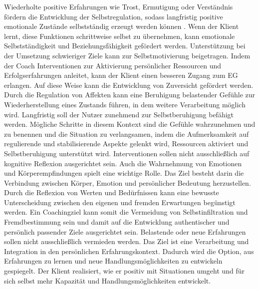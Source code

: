 Wiederholte positive Erfahrungen wie Trost, Ermutigung oder Verständnis fördern die Entwicklung der Selbstregulation, sodass langfristig positive emotionale Zustände selbstständig erzeugt werden können \citep{storch2007ressourcenorientiertes}. Wenn der Klient lernt, diese Funktionen schrittweise selbst zu übernehmen, kann emotionale Selbstständigkeit und Beziehungsfähigkeit gefördert werden. Unterstützung bei der Umsetzung schwieriger Ziele kann zur Selbstmotivierung beigetragen. Indem der Coach Interventionen zur Aktivierung persönlicher Ressourcen und Erfolgserfahrungen anleitet, kann der Klient einen besseren Zugang zum EG erlangen. Auf diese Weise kann die Entwicklung von Zuversicht gefördert werden. Durch die Regulation von Affekten kann eine Beruhigung belastender Gefühle zur Wiederherstellung eines Zustands führen, in dem weitere Verarbeitung möglich wird. Langfristig soll der Nutzer zunehmend zur Selbstberuhigung befähigt werden. Mögliche Schritte in diesem Kontext sind die Gefühle wahrzunehmen und zu benennen und die Situation zu verlangsamen, indem die Aufmerksamkeit auf regulierende und stabilisierende Aspekte gelenkt wird, Ressourcen aktiviert und Selbstberuhigung unterstützt wird. Interventionen sollen nicht ausschließlich auf kognitive Reflexion ausgerichtet sein. Auch die Wahrnehmung von Emotionen und Körperempfindungen spielt eine wichtige Rolle. Das Ziel besteht darin die Verbindung zwischen Körper, Emotion und persönlicher Bedeutung herzustellen. 
Durch die Reflexion von Werten und Bedürfnissen kann eine bewusste Unterscheidung zwischen den eigenen und fremden Erwartungen begünstigt werden. Ein Coachingziel kann somit die Vermeidung von Selbstinfiltration und Fremdbestimmung sein und damit auf die Entwicklung authentischer und persönlich passender Ziele ausgerichtet sein. Belastende oder neue Erfahrungen sollen nicht ausschließlich vermieden werden. Das Ziel ist eine Verarbeitung und Integration in den persönlichen Erfahrungskontext. Dadurch wird die Option, aus Erfahrungen zu lernen und neue Handlungsmöglichkeiten zu entwickeln gespiegelt. Der Klient realisiert, wie er positiv mit Situationen umgeht und für sich selbst mehr Kapazität und Handlungsmöglichkeiten entwickelt. 


